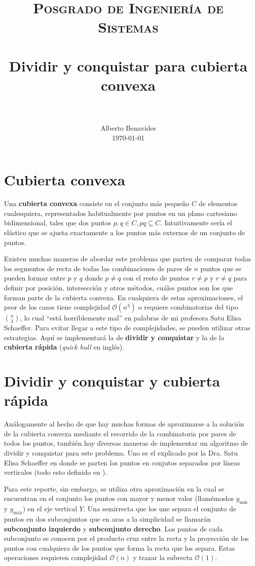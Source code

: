 \documentclass[paper=leter, fontsize=11pt]{scrartcl}
\title{
		\usefont{OT1}{bch}{b}{n}
		\normalfont \normalsize \textsc{Posgrado de Ingeniería de Sistemas} \\ [25pt]
		\horrule{0.5pt} \\[0.4cm]
		\huge Dividir y conquistar para cubierta convexa \\
		\horrule{2pt} \\[0.5cm]
}
\author{
		\normalfont 								\normalsize
        Alberto Benavides\\[-3pt]		\normalsize
        \today
}
\date{}
\numberwithin{equation}{section}		%
\numberwithin{figure}{section}			%
\numberwithin{table}{section}				%
\begin{document}
\maketitle

\section{Cubierta convexa}
Una \textbf{cubierta convexa} consiste en el conjunto más pequeño $C$ de elementos cualesquiera, representados habitualmente por puntos en un plano cartesiano bidimensional, tales que dos puntos $p, q \in C, \overline{pq} \subseteq C$. Intuitivamente sería el elástico que se ajusta exactamente a los puntos más externos de un conjunto de puntos.

Existen muchas maneras de abordar este problema que parten de comparar todas los segmentos de recta de todas las combinaciones de pares de $n$ puntos que se pueden formar entre $p$ y $q$ donde $p \neq q$ con el resto de puntos $r \neq p$ y $r \neq q$ para definir por posición, intersección y otros métodos, cuáles puntos son los que forman parte de la cubierta convexa. En cualquiera de estas aproximaciones, el peor de los casos tiene complejidad $\mathcal{O}(n^3)$ o requiere combinatorias del tipo $\binom{n}{3}$, lo cual ``está horriblemente mal'' en palabras de mi profesora Satu Elisa Schaeffer. Para evitar llegar a este tipo de complejidades, se pueden utilizar otras estrategias. Aquí se implementará la de \textbf{dividir y conquistar} y la de la \textbf{cubierta rápida} (\textit{quick hull} en inglés).

\section{Dividir y conquistar y cubierta rápida}
Análogamente al hecho de que hay muchas formas de aproximarse a la solución de la cubierta convexa mediante el recorrido de la combinatoria por pares de todos los puntos, también hay diversas maneras de implementar un algoritmo de dividir y conquistar para este problema. Uno es el explicado por la Dra. Satu Elisa Schaeffer en donde se parten los puntos en conjutos separados por líneas verticales (todo esto definido en \cite{aa}).

Para este reporte, sin embargo, se utiliza otra aproximación en la cual se encuentran en el conjunto los puntos con mayor y menor valor (llamémoslos $y_{\text{mín}}$ y $y_{\text{máx}}$) en el eje vertical $Y$. Una semirrecta que los une separa el conjunto de puntos en dos subconjuntos que en aras a la simplicidad se llamarán \textbf{subconjunto izquierdo} y \textbf{subconjunto derecho}. Los puntos de cada subconjunto se conocen por el producto cruz entre la recta y la proyección de los puntos con cualquiera de los puntos que forma la recta que los separa. Estas operaciones requieren complejidad $\mathcal{O}(n)$ y trazar la subrecta $\mathcal{O}(1)$. 
\end{document}
